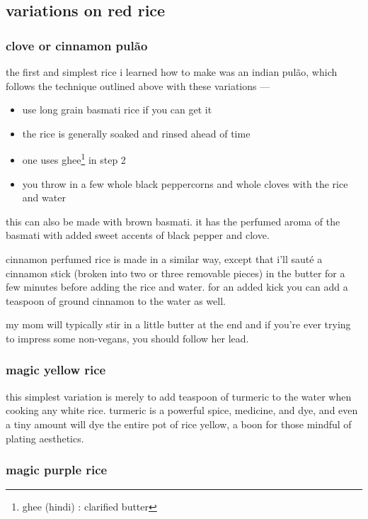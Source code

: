\subsection{variations on red rice}

\subsubsection{clove or cinnamon pul\~{a}o}

the first and simplest rice i learned how to make was an indian
pul\~{a}o, which follows the technique outlined above with these
variations ---
\begin{itemize}
  \item use long grain basmati rice if you can get it

  \item the rice is generally soaked and rinsed ahead of time

  \item one uses ghee\footnote{ghee (hindi) : clarified butter} in
  step 2
  
  \item you throw in a few whole black peppercorns and whole cloves
  with the rice and water
\end{itemize}

this can also be made with brown basmati. it has the perfumed aroma of the 
basmati with added sweet accents of black pepper and clove.

cinnamon perfumed rice is made in a similar way, except that i'll
saut\'e a cinnamon stick (broken into two or three removable pieces)
in the butter for a few minutes before adding the rice and water. for
an added kick you can add a \onehalf teaspoon of ground cinnamon to the
water as well.

my mom will typically stir in a little butter at the end and if you're
ever trying to impress some non-vegans, you should follow her lead.

\subsubsection{magic yellow rice}

this simplest variation is merely to add \onehalf teaspoon of turmeric to
the water when cooking any white rice. turmeric is a powerful spice,
medicine, and dye, and even a tiny amount will dye the entire pot of
rice yellow, a boon for those mindful of plating aesthetics.

\subsubsection{magic purple rice}

